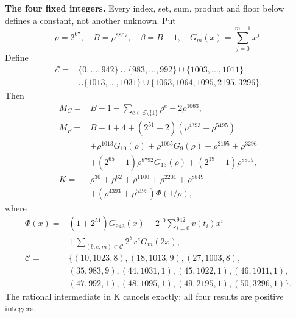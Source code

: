 \documentclass[11pt]{article}
\theoremstyle{remark}\newtheorem{remark}[theorem]{Remark}
\newcommand{\rg}[2]{\{#1,\ldots,#2\}}
\begin{document}
\begingroup\small
\textbf{The four fixed integers.}
Every index, set, sum, product and floor below defines a constant, not
another unknown. Put
\[
\rho=2^{67},\quad B=\rho^{8807},\quad\beta=B-1,\quad
G_m(x)=\sum_{j=0}^{m-1}x^j.
\]
Define
\[
\begin{split}
\mathcal E={}&\rg0{942}\cup\rg{983}{992}\cup\rg{1003}{1011}\\
&\cup\rg{1013}{1031}\cup\{1063,1064,1095,2195,3296\}.
\end{split}
\]
Then
\begin{align*}
M_C={}&B-1-\sum_{e\in\mathcal E\setminus\{1\}}\rho^e-2\rho^{1063},\\
M_F={}&B-1+4+(2^{51}-2)(\rho^{4393}+\rho^{5495})\\
&+\rho^{1013}G_{10}(\rho)+\rho^{1065}G_9(\rho)
  +\rho^{2195}+\rho^{3296}\\
&+(2^{65}-1)\rho^{8792}G_{13}(\rho)+(2^{19}-1)\rho^{8805},\\
K={}&\rho^{30}+\rho^{62}+\rho^{1100}+\rho^{2201}+\rho^{8849}\\
&+(\rho^{4393}+\rho^{5495})\Phi(1/\rho),
\end{align*}
where
\[
\begin{split}
\Phi(x)={}&(1+2^{51})G_{943}(x)
 -2^{10}\sum_{i=0}^{942}v(t_i)x^i\\
&+\sum_{(b,e,m)\in\mathcal C}2^b x^e G_m(2x),\\
\mathcal C={}&\{(10,1023,8),(18,1013,9),(27,1003,8),\\
&(35,983,9),(44,1031,1),(45,1022,1),(46,1011,1),\\
&(47,992,1),(48,1095,1),(49,2195,1),(50,3296,1)\}.
\end{split}
\]
The rational intermediate in K cancels exactly; all four results are positive integers.
\end{document}
